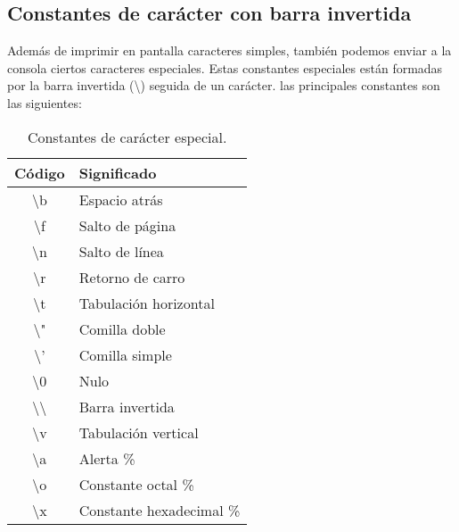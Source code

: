 \subsection{Constantes de carácter con barra invertida}{
Además de imprimir en pantalla caracteres simples, también podemos enviar a la consola ciertos caracteres especiales. Estas constantes especiales están formadas por la barra invertida (\textbackslash) seguida de un carácter. las principales constantes son las siguientes:
\begin{table}[htbp]
	\begin{center}
		\begin{tabular}{|c|l|}
			\hline
			\textbf{Código} & \textbf{Significado}  \\
			\hline 
			\textbackslash b  & Espacio atrás\\ \hline
			\textbackslash f  & Salto de página\\ \hline
			\textbackslash n  & Salto de línea\\ \hline
			\textbackslash r  & Retorno de carro\\ \hline
			\textbackslash t  & Tabulación horizontal\\ \hline
			\textbackslash "  & Comilla doble\\ \hline	
			\textbackslash '  & Comilla simple\\ \hline
			\textbackslash0  & Nulo\\ \hline
			\textbackslash\textbackslash  & Barra invertida\\ \hline
			\textbackslash v  & Tabulación vertical\\ \hline
			\textbackslash a  & Alerta \%\\ \hline
			\textbackslash o  & Constante octal \%\\ \hline
			\textbackslash x  & Constante hexadecimal \%\\ \hline
		\end{tabular}
		\caption{Constantes de carácter especial.}
		\label{tabla:Constantes de carácter especial}
	\end{center}
\end{table}\\

}